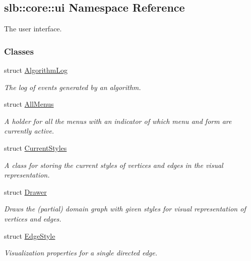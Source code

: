 \hypertarget{namespaceslb_1_1core_1_1ui}{}\subsection{slb\+:\+:core\+:\+:ui Namespace Reference}
\label{namespaceslb_1_1core_1_1ui}


The user interface.  


\subsubsection*{Classes}
\begin{DoxyCompactItemize}
\item 
struct \hyperlink{structslb_1_1core_1_1ui_1_1AlgorithmLog}{Algorithm\+Log}
\begin{DoxyCompactList}\small\item\em The log of events generated by an algorithm. \end{DoxyCompactList}\item 
struct \hyperlink{structslb_1_1core_1_1ui_1_1AllMenus}{All\+Menus}
\begin{DoxyCompactList}\small\item\em A holder for all the menus with an indicator of which menu and form are currently active. \end{DoxyCompactList}\item 
struct \hyperlink{structslb_1_1core_1_1ui_1_1CurrentStyles}{Current\+Styles}
\begin{DoxyCompactList}\small\item\em A class for storing the current styles of vertices and edges in the visual representation. \end{DoxyCompactList}\item 
struct \hyperlink{structslb_1_1core_1_1ui_1_1Drawer}{Drawer}
\begin{DoxyCompactList}\small\item\em Draws the (partial) domain graph with given styles for visual representation of vertices and edges. \end{DoxyCompactList}\item 
struct \hyperlink{structslb_1_1core_1_1ui_1_1EdgeStyle}{Edge\+Style}
\begin{DoxyCompactList}\small\item\em Visualization properties for a single directed edge. \end{DoxyCompactList}\item 

\end{DoxyCompactItemize}
